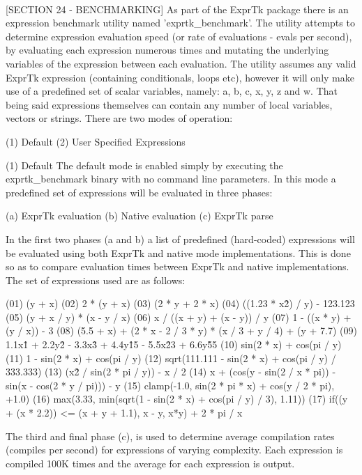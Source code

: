 {~~~~~~~~~~~~~~~~~~~~~~~~~~~~~~~~~~~~~~~~~~~~~~~~~~~~~~~~~~

[SECTION 24 - BENCHMARKING]
As part of the ExprTk package there is an expression benchmark utility
named 'exprtk\_benchmark'. The utility attempts to determine expression
evaluation  speed (or  rate of  evaluations -  evals  per  second), by
evaluating each expression numerous times and mutating the  underlying
variables  of  the  expression between  each  evaluation.  The utility
assumes any  valid ExprTk  expression (containing  conditionals, loops
etc), however  it will  only make  use of  a predefined  set of scalar
variables, namely: a, b, c, x, y, z and w. That being said expressions
themselves  can  contain any  number  of local  variables,  vectors or
strings. There are two modes of operation:

(1) Default
(2) User Specified Expressions


(1) Default
The default mode is  enabled simply by executing  the exprtk\_benchmark
binary with no command line parameters. In this mode a predefined  set
of expressions will be evaluated in three phases:

(a) ExprTk evaluation
(b) Native evaluation
(c) ExprTk parse


In the first two  phases (a and b)  a list of predefined  (hard-coded)
expressions  will  be  evaluated using  both  ExprTk  and native  mode
implementations.  This  is  done so  as  to  compare evaluation  times
between ExprTk and native implementations. The set of expressions used
are as follows:

(01) (y + x)
(02) 2 * (y + x)
(03) (2 * y + 2 * x)
(04) ((1.23 * x\^2) / y) - 123.123
(05) (y + x / y) * (x - y / x)
(06) x / ((x + y) + (x - y)) / y
(07) 1 - ((x * y) + (y / x)) - 3
(08) (5.5 + x) + (2 * x - 2 / 3 * y) * (x / 3 + y / 4) + (y + 7.7)
(09) 1.1x\^1 + 2.2y\^2 - 3.3x\^3 + 4.4y\^15 - 5.5x\^23 + 6.6y\^55
(10) sin(2 * x) + cos(pi / y)
(11) 1 - sin(2 * x) + cos(pi / y)
(12) sqrt(111.111 - sin(2 * x) + cos(pi / y) / 333.333)
(13) (x\^2 / sin(2 * pi / y)) - x / 2
(14) x + (cos(y - sin(2 / x * pi)) - sin(x - cos(2 * y / pi))) - y
(15) clamp(-1.0, sin(2 * pi * x) + cos(y / 2 * pi), +1.0)
(16) max(3.33, min(sqrt(1 - sin(2 * x) + cos(pi / y) / 3), 1.11))
(17) if((y + (x * 2.2)) <= (x + y + 1.1), x - y, x*y) + 2 * pi / x


The  third  and  final  phase  (c),  is  used  to  determine   average
compilation rates  (compiles per  second) for  expressions of  varying
complexity. Each expression is compiled 100K times and the average for
each expression is output.


}
